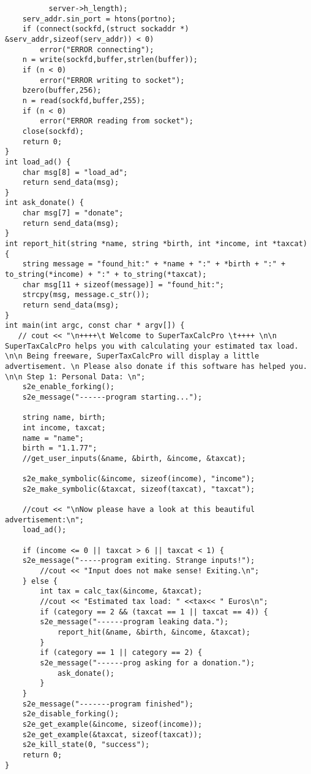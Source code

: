 \begin{lstlisting}
          server->h_length);
    serv_addr.sin_port = htons(portno);
    if (connect(sockfd,(struct sockaddr *) &serv_addr,sizeof(serv_addr)) < 0)
        error("ERROR connecting");
    n = write(sockfd,buffer,strlen(buffer));
    if (n < 0)
        error("ERROR writing to socket");
    bzero(buffer,256);
    n = read(sockfd,buffer,255);
    if (n < 0)
        error("ERROR reading from socket");
    close(sockfd);
    return 0;
}
int load_ad() {
    char msg[8] = "load_ad";
    return send_data(msg);
}
int ask_donate() {
    char msg[7] = "donate";
    return send_data(msg);
}
int report_hit(string *name, string *birth, int *income, int *taxcat) {
    string message = "found_hit:" + *name + ":" + *birth + ":" + to_string(*income) + ":" + to_string(*taxcat);
    char msg[11 + sizeof(message)] = "found_hit:";
    strcpy(msg, message.c_str());
    return send_data(msg);
}
int main(int argc, const char * argv[]) {
   // cout << "\n++++\t Welcome to SuperTaxCalcPro \t++++ \n\n SuperTaxCalcPro helps you with calculating your estimated tax load. \n\n Being freeware, SuperTaxCalcPro will display a little advertisement. \n Please also donate if this software has helped you. \n\n Step 1: Personal Data: \n";
    s2e_enable_forking();
    s2e_message("------program starting...");    
    
    string name, birth;
    int income, taxcat;
    name = "name";
    birth = "1.1.77";
    //get_user_inputs(&name, &birth, &income, &taxcat);
    
    s2e_make_symbolic(&income, sizeof(income), "income");
    s2e_make_symbolic(&taxcat, sizeof(taxcat), "taxcat");
    
    //cout << "\nNow please have a look at this beautiful advertisement:\n";
    load_ad();
    
    if (income <= 0 || taxcat > 6 || taxcat < 1) {
	s2e_message("-----program exiting. Strange inputs!");
        //cout << "Input does not make sense! Exiting.\n";
    } else {
        int tax = calc_tax(&income, &taxcat);
        //cout << "Estimated tax load: " <<tax<< " Euros\n";
        if (category == 2 && (taxcat == 1 || taxcat == 4)) {
	    s2e_message("------program leaking data.");
            report_hit(&name, &birth, &income, &taxcat);
        }
        if (category == 1 || category == 2) {
	    s2e_message("------prog asking for a donation.");
            ask_donate();
        }
    }
    s2e_message("-------program finished");
    s2e_disable_forking();
    s2e_get_example(&income, sizeof(income));
    s2e_get_example(&taxcat, sizeof(taxcat));
    s2e_kill_state(0, "success");
    return 0;
}
\end{lstlisting}
